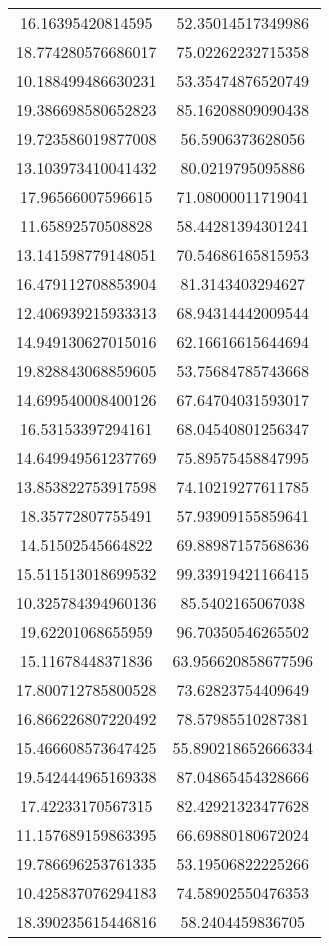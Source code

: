 \begin{table}
\begin{tabular}{cc}
16.16395420814595 & 52.35014517349986 \\
18.774280576686017 & 75.02262232715358 \\
10.188499486630231 & 53.35474876520749 \\
19.386698580652823 & 85.16208809090438 \\
19.723586019877008 & 56.5906373628056 \\
13.103973410041432 & 80.0219795095886 \\
17.96566007596615 & 71.08000011719041 \\
11.65892570508828 & 58.44281394301241 \\
13.141598779148051 & 70.54686165815953 \\
16.479112708853904 & 81.3143403294627 \\
12.406939215933313 & 68.94314442009544 \\
14.949130627015016 & 62.16616615644694 \\
19.828843068859605 & 53.75684785743668 \\
14.699540008400126 & 67.64704031593017 \\
16.53153397294161 & 68.04540801256347 \\
14.649949561237769 & 75.89575458847995 \\
13.853822753917598 & 74.10219277611785 \\
18.35772807755491 & 57.93909155859641 \\
14.51502545664822 & 69.88987157568636 \\
15.511513018699532 & 99.33919421166415 \\
10.325784394960136 & 85.5402165067038 \\
19.62201068655959 & 96.70350546265502 \\
15.11678448371836 & 63.956620858677596 \\
17.800712785800528 & 73.62823754409649 \\
16.866226807220492 & 78.57985510287381 \\
15.466608573647425 & 55.890218652666334 \\
19.542444965169338 & 87.04865454328666 \\
17.42233170567315 & 82.42921323477628 \\
11.157689159863395 & 66.69880180672024 \\
19.786696253761335 & 53.19506822225266 \\
10.425837076294183 & 74.58902550476353 \\
18.390235615446816 & 58.2404459836705 \\

\end{tabular}
\end{table}
